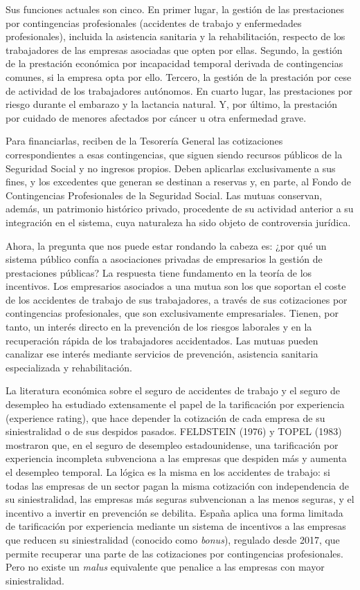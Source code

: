 \documentclass[10pt,a4paper]{article}
\begin{document}
Sus funciones actuales son cinco. En primer lugar, la gestión de las prestaciones por contingencias profesionales (accidentes de trabajo y enfermedades profesionales), incluida la asistencia sanitaria y la rehabilitación, respecto de los trabajadores de las empresas asociadas que opten por ellas. Segundo, la gestión de la prestación económica por incapacidad temporal derivada de contingencias comunes, si la empresa opta por ello. Tercero, la gestión de la prestación por cese de actividad de los trabajadores autónomos. En cuarto lugar, las prestaciones por riesgo durante el embarazo y la lactancia natural. Y, por último, la prestación por cuidado de menores afectados por cáncer u otra enfermedad grave. 

Para financiarlas, reciben de la Tesorería General las cotizaciones correspondientes a esas contingencias, que siguen siendo recursos públicos de la Seguridad Social y no ingresos propios. Deben aplicarlas exclusivamente a sus fines, y los excedentes que generan se destinan a reservas y, en parte, al Fondo de Contingencias Profesionales de la Seguridad Social. Las mutuas conservan, además, un patrimonio histórico privado, procedente de su actividad anterior a su integración en el sistema, cuya naturaleza ha sido objeto de controversia jurídica.

Ahora, la pregunta que nos puede estar rondando la cabeza es: ¿por qué un sistema público confía a asociaciones privadas de empresarios la gestión de prestaciones públicas? La respuesta tiene fundamento en la teoría de los incentivos. Los empresarios asociados a una mutua son los que soportan el coste de los accidentes de trabajo de sus trabajadores, a través de sus cotizaciones por contingencias profesionales, que son exclusivamente empresariales. Tienen, por tanto, un interés directo en la prevención de los riesgos laborales y en la recuperación rápida de los trabajadores accidentados. Las mutuas pueden canalizar ese interés mediante servicios de prevención, asistencia sanitaria especializada y rehabilitación.

La literatura económica sobre el seguro de accidentes de trabajo y el seguro de desempleo ha estudiado extensamente el papel de la tarificación por experiencia (experience rating), que hace depender la cotización de cada empresa de su siniestralidad o de sus despidos pasados. FELDSTEIN (1976) y TOPEL (1983) mostraron que, en el seguro de desempleo estadounidense, una tarificación por experiencia incompleta subvenciona a las empresas que despiden más y aumenta el desempleo temporal. La lógica es la misma en los accidentes de trabajo: si todas las empresas de un sector pagan la misma cotización con independencia de su siniestralidad, las empresas más seguras subvencionan a las menos seguras, y el incentivo a invertir en prevención se debilita. España aplica una forma limitada de tarificación por experiencia mediante un sistema de incentivos a las empresas que reducen su siniestralidad (conocido como \textit{bonus}), regulado desde 2017, que permite recuperar una parte de las cotizaciones por contingencias profesionales. Pero no existe un \textit{malus} equivalente que penalice a las empresas con mayor siniestralidad.
\end{document}
